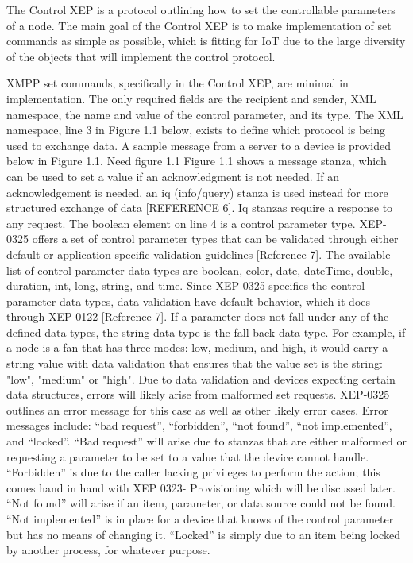 The Control XEP is a protocol outlining how to set the controllable parameters of a node. The main goal of the Control XEP is to make implementation of set commands as simple as possible, which is fitting for IoT due to the large diversity of the objects that will implement the control protocol.

XMPP set commands, specifically in the Control XEP, are minimal in implementation. The only required fields are the recipient and sender, XML namespace, the name and value of the control parameter, and its type. The XML namespace, line 3 in Figure 1.1 below, exists to define which protocol is being used to exchange data. A sample message from a server to a device is provided below in Figure 1.1.
Need figure 1.1 
        Figure 1.1 shows a message stanza, which can be used to set a value if an acknowledgment is not needed. If an acknowledgement is needed, an iq (info/query) stanza is used instead for more structured exchange of data [REFERENCE 6]. Iq stanzas require a response to any request.
        The boolean element on line 4 is a control parameter type. XEP-0325 offers a set of control parameter types that can be validated through either default or application specific validation guidelines [Reference 7]. The available list of control parameter data types are boolean, color, date, dateTime, double, duration, int, long, string, and time. Since XEP-0325 specifies the control parameter data types, data validation have default behavior, which it does through XEP-0122 [Reference 7]. If a parameter does not fall under any of the defined data types, the string data type is the fall back data type. For example, if a node is a fan that has three modes: low, medium, and high, it would carry a string value with data validation that ensures that the value set is the string: "low", "medium" or "high".
        Due to data validation and devices expecting certain data structures, errors will likely arise from malformed set requests. XEP-0325 outlines an error message for this case as well as other likely error cases. Error messages include: “bad request”, “forbidden”, “not found”, “not implemented”, and “locked”. “Bad request” will arise due to stanzas that are either malformed or requesting a parameter to be set to a value that the device cannot handle. “Forbidden” is due to the caller lacking privileges to perform the action; this comes hand in hand with XEP 0323- Provisioning which will be discussed later. “Not found” will arise if an item, parameter, or data source could not be found. “Not implemented” is in place for a device that knows of the control parameter but has no means of changing it. “Locked” is simply due to an item being locked by another process, for whatever purpose.
